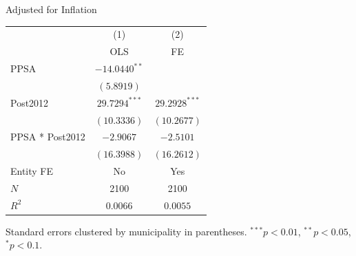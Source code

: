 \begin{table}[H]
    \centering
    \scriptsize
    \begin{minipage}{\textwidth}
    \centering
    {\normalsize Adjusted for Inflation}
    \vspace{6pt}
    \begin{tabular}{lcc}
        \toprule
         & (1) & (2) \\
         & OLS & FE \\
        \midrule
        PPSA & $-14.0440^{**}$ &  \\
         & $(5.8919)$ &  \\[4pt]
        Post2012 & $29.7294^{***}$ & $29.2928^{***}$ \\
         & $(10.3336)$ & $(10.2677)$ \\[4pt]
        PPSA * Post2012 & $-2.9067$ & $-2.5101$ \\
         & $(16.3988)$ & $(16.2612)$ \\[4pt]
        \midrule
        Entity FE & No & Yes \\
        $N$ & 2100 & 2100 \\
        $R^2$ & $0.0066$ & $0.0055$ \\
        \bottomrule
    \end{tabular}

    \vspace{6pt}
    {\scriptsize Standard errors clustered by municipality in parentheses. $^{***}p<0.01$, $^{**}p<0.05$, $^{*}p<0.1$.}
    \end{minipage}
\end{table}